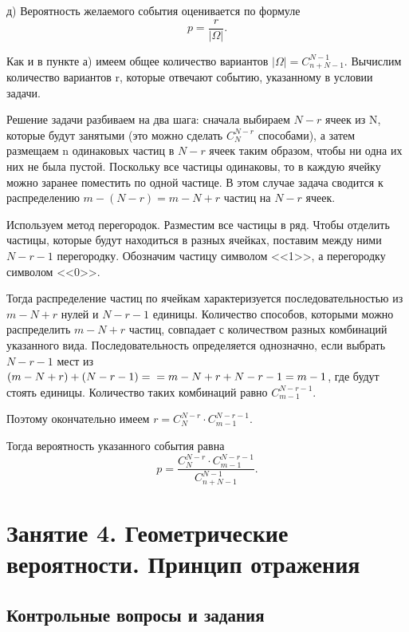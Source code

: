 \documentclass{book}
\begin{document}
д) Вероятность желаемого события оценивается по формуле
$$ p =
\frac{r}{| \Omega |}.$$

Как и в пункте а) имеем общее количество вариантов $ | \Omega | = C_{n+N-1}^{N-1} $.
Вычислим количество вариантов r, которые отвечают событию, указанному в условии задачи.

Решение задачи разбиваем на два шага:
сначала выбираем $ N - r $ ячеек из N, которые будут занятыми (это можно сделать $ C_{N}^{N-r} $ способами),
а затем размещаем n одинаковых частиц в $ N - r $ ячеек таким образом, чтобы ни одна их них не была пустой.
Поскольку все частицы одинаковы, то в каждую ячейку можно заранее поместить по одной частице.
В этом случае задача сводится к распределению $ m - \left( N - r \right) = m - N + r $ частиц на $ N - r $ ячеек.

Используем метод перегородок.
Разместим все частицы в ряд.
Чтобы отделить частицы, которые будут находиться в разных ячейках, поставим между ними $ N - r - 1 $ перегородку.
Обозначим частицу символом <<1>>, а перегородку символом <<0>>.

Тогда распределение частиц по ячейкам характеризуется последовательностью из $ m - N + r $ нулей и $ N - r - 1 $ единицы.
Количество способов, которыми можно распределить $ m - N + r $ частиц, совпадает с количеством разных комбинаций указанного вида.
Последовательность определяется однозначно, если выбрать $ N - r - 1 $ мест из
$ \left( m - N + r \right) + \left( N - r - 1 \right) = \\
= m - N + r + N - r - 1 = m - 1 $,
где будут стоять единицы.
Количество таких комбинаций равно $ C_{m-1}^{N - r - 1} $.

Поэтому окончательно имеем $ r = C_{N}^{N-r} \cdot C_{m-1}^{N - r - 1} $.

Тогда вероятность указанного события равна
$$ p =
\frac{C_{N}^{N-r} \cdot C_{m-1}^{N - r - 1}}{C_{n+N-1}^{N-1}}.$$

\chapter*{Занятие 4. Геометрические вероятности. Принцип отражения}

\section*{Контрольные вопросы и задания}
\end{document}
